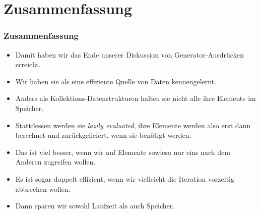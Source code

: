 \documentclass[aspectratio=169,mathserif,notheorems]{beamer}%
\begin{document}
\section{Zusammenfassung}%
%
\begin{frame}%
\frametitle{Zusammenfassung}%
%
\begin{itemize}%
\item Damit haben wir das Ende unserer Diskussion von Generator-Ausdrücken erreicht.%
%
\item<2-> Wir haben sie als eine effiziente Quelle von Daten kennengelernt.%
%
\item<3-> Anders als Kollektions-Datenstrukturen halten sie nicht alle ihre Elemente im Speicher.%
%
\item<4-> Stattdessen werden sie \emph{lazily evaluated}, ihre Elemente werden also erst dann berechnet und zurückgeliefert, wenn sie benötigt werden.%
%
\item<5-> Das ist viel besser, wenn wir auf Elemente sowieso nur eins nach dem Anderen zugreifen wollen.%
%
\item<6-> Es ist sogar doppelt effizient, wenn wir vielleicht die Iteration vorzeitig abbrechen wollen.%
%
\item<7-> Dann sparen wir sowohl Laufzeit als auch Speicher.%
\end{itemize}%
\end{frame}%
%
\endPresentation%
\end{document}
